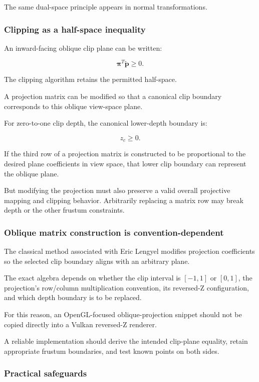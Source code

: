 The same dual-space principle appears in normal transformations.

\subsubsection{Clipping as a half-space inequality}\label{clipping-as-a-half-space-inequality}

An inward-facing oblique clip plane can be written:

\[
 \boxed{ \boldsymbol\pi^T\tilde{\mathbf p}\ge0 }.
\]

The clipping algorithm retains the permitted half-space.

A projection matrix can be modified so that a canonical clip boundary corresponds to this oblique view-space plane.

For zero-to-one clip depth, the canonical lower-depth boundary is:

\[
 z_c\ge0.
\]

If the third row of a projection matrix is constructed to be proportional to the desired plane coefficients in view space, that lower clip boundary can represent the oblique plane.

But modifying the projection must also preserve a valid overall projective mapping and clipping behavior. Arbitrarily replacing a matrix row may break depth or the other frustum constraints.

\subsubsection{Oblique matrix construction is convention-dependent}\label{oblique-matrix-construction-is-convention-dependent}

The classical method associated with Eric Lengyel modifies projection coefficients so the selected clip boundary aligns with an arbitrary plane.

The exact algebra depends on whether the clip interval is \([-1,1]\) or \([0,1]\), the projection's row/column multiplication convention, its reversed-Z configuration, and which depth boundary is to be replaced.

For this reason, an OpenGL-focused oblique-projection snippet should not be copied directly into a Vulkan reversed-Z renderer.

A reliable implementation should derive the intended clip-plane equality, retain appropriate frustum boundaries, and test known points on both sides.

\subsubsection{Practical safeguards}\label{practical-safeguards}

